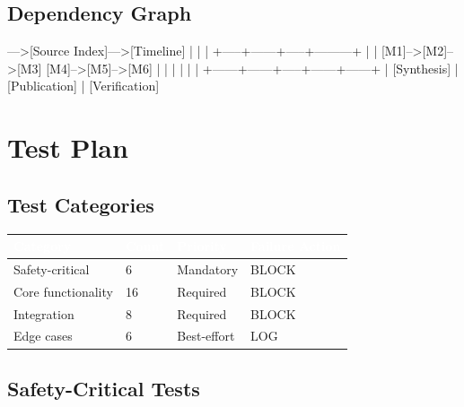 \documentclass[11pt,letterpaper]{article}
\newcommand{\tableheader}[1]{\textbf{\sffamily\textcolor{white}{#1}}}
\begin{document}
\subsection{Dependency Graph}

\begin{asciibox}
[Schema]--->[Source Index]--->[Timeline]
     |            |                |
     +-----+------+-----+---------+
           |             |
    [M1]-->[M2]-->[M3]  [M4]-->[M5]-->[M6]
     |      |      |     |      |      |
     +------+------+-----+------+------+
                   |
            [Synthesis]
                   |
            [Publication]
                   |
           [Verification]
\end{asciibox}

\section{Test Plan}

\subsection{Test Categories}

\begin{center}
\begin{tabularx}{\textwidth}{L{3cm}C{1.5cm}C{1.5cm}X}
\toprule
{}
\tableheader{Category} & \tableheader{Count} & \tableheader{Priority} & \tableheader{Failure Action} \\
\midrule
Safety-critical & 6 & Mandatory & BLOCK \\
Core functionality & 16 & Required & BLOCK \\
Integration & 8 & Required & BLOCK \\
Edge cases & 6 & Best-effort & LOG \\
\bottomrule
\end{tabularx}
\end{center}

\subsection{Safety-Critical Tests}
\end{document}
